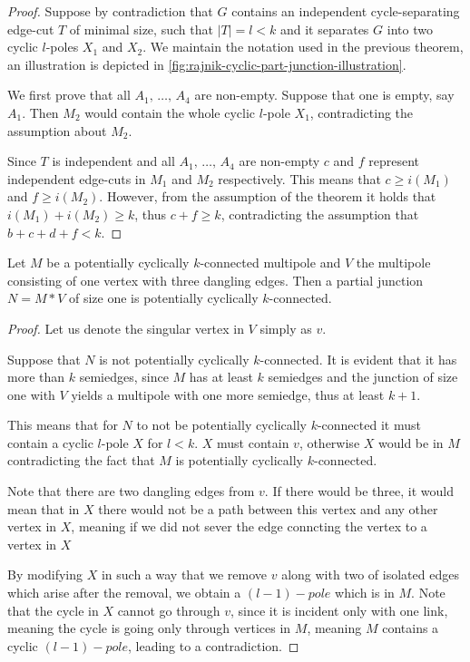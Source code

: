 \documentclass[12pt, twoside]{book}
\begin{document}
\begin{proof}
	Suppose by contradiction that $G$ contains an independent cycle-separating edge-cut $T$ of minimal size, such that $|T|=l<k$ and it separates $G$ into two cyclic $l$-poles $X_1$ and $X_2$. We maintain the notation used in the previous theorem, an illustration is depicted in \cref{fig:rajnik-cyclic-part-junction-illustration}.
	
	We first prove that all $A_1,\,\dots,\,A_4$ are non-empty. Suppose that one is empty, say $A_1$. Then $M_2$ would contain the whole cyclic $l$-pole $X_1$, contradicting the assumption about $M_2$.
	
	Since $T$ is independent and all $A_1,\,\dots,\,A_4$ are non-empty $c$ and $f$ represent independent edge-cuts in $M_1$ and $M_2$ respectively. This means that ${c\geq i(M_1)}$ and ${f\geq i(M_2)}$. However, from the assumption of the theorem it holds that ${i(M_1)+i(M_2)\geq k}$, thus ${c+f\geq k}$, contradicting the assumption that ${b+c+d+f<k}$.
\end{proof}

\begin{lemma}
	Let $M$ be a potentially cyclically $k$-connected multipole and $V$ the multipole consisting of one vertex with three dangling edges. Then a partial junction $N=M*V$ of size one is potentially cyclically $k$-connected.
\end{lemma}

\begin{proof}
	Let us denote the singular vertex in $V$ simply as $v$.
	
	Suppose that $N$ is not potentially cyclically $k$-connected. It is evident that it has more than $k$ semiedges, since $M$ has at least $k$ semiedges and the junction of size one with $V$ yields a multipole with one more semiedge, thus at least $k+1$.
	
	This means that for $N$ to not be potentially cyclically $k$-connected it must contain a cyclic $l$-pole $X$ for $l<k$. $X$ must contain $v$, otherwise $X$ would be in $M$ contradicting the fact that $M$ is potentially cyclically $k$-connected.
	
	Note that there are two dangling edges from $v$. If there would be three, it would mean that in $X$ there would not be a path between this vertex and any other vertex in $X$, meaning if we did not sever the edge conncting the vertex to a vertex in $X$ 
	
	By modifying $X$ in such a way that we remove $v$ along with two of isolated edges which arise after the removal, we obtain a $(l-1)-pole$ which is in $M$. Note that the cycle in $X$ cannot go through $v$, since it is incident only with one link, meaning the cycle is going only through vertices in $M$, meaning $M$ contains a cyclic $(l-1)-pole$, leading to a contradiction.
	
\end{proof}
\end{document}
